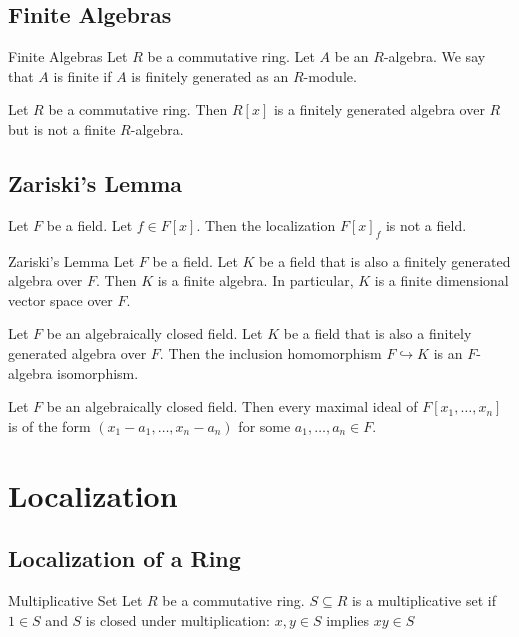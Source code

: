 \documentclass[a4paper]{article}
\begin{document}
\subsection{Finite Algebras}
\begin{defn}{Finite Algebras}{} Let $R$ be a commutative ring. Let $A$ be an $R$-algebra. We say that $A$ is finite if $A$ is finitely generated as an $R$-module. 
\end{defn}

\begin{eg}{}{} Let $R$ be a commutative ring. Then $R[x]$ is a finitely generated algebra over $R$ but is not a finite $R$-algebra. 
\end{eg}

\subsection{Zariski's Lemma}
\begin{lmm}{}{} Let $F$ be a field. Let $f\in F[x]$. Then the localization $F[x]_f$ is not a field. 
\end{lmm}

\begin{thm}{Zariski's Lemma}{} Let $F$ be a field. Let $K$ be a field that is also a finitely generated algebra over $F$. Then $K$ is a finite algebra. In particular, $K$ is a finite dimensional vector space over $F$. 
\end{thm}

\begin{crl}{}{} Let $F$ be an algebraically closed field. Let $K$ be a field that is also a finitely generated algebra over $F$. Then the inclusion homomorphism $F\hookrightarrow K$ is an $F$-algebra isomorphism. 
\end{crl}

\begin{crl}{}{} Let $F$ be an algebraically closed field. Then every maximal ideal of $F[x_1,\dots,x_n]$ is of the form $(x_1-a_1,\dots,x_n-a_n)$ for some $a_1,\dots,a_n\in F$. 
\end{crl}

\pagebreak
\section{Localization}
\subsection{Localization of a Ring}
\begin{defn}{Multiplicative Set}{} Let $R$ be a commutative ring. $S\subseteq R$ is a multiplicative set if $1\in S$ and $S$ is closed under multiplication: $x,y\in S$ implies $xy\in S$
\end{defn}
\end{document}
